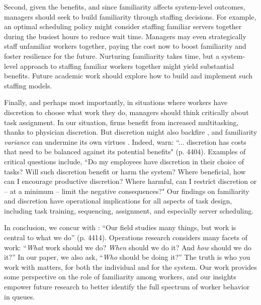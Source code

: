  Second, given the benefits, and since familiarity affects system-level outcomes, managers should seek to build familiarity through staffing decisions. For example, an optimal scheduling policy might consider staffing familiar servers together during the busiest hours to reduce wait time. Managers may even strategically staff unfamiliar workers together, paying the cost now to boost familiarity and foster resilience for the future. Nurturing familiarity takes time, but a system-level approach to staffing familiar workers together might yield substantial benefits. Future academic work should explore how to build and implement such staffing models.
 
 Finally, and perhaps most importantly, in situations where workers have discretion to choose what work they do, managers should think critically about task assignment. In our situation, firms benefit from increased multitasking, thanks to physician discretion. But discretion might also backfire \citep[e.g.,][]{Ibanez2017}, and familiarity \textit{variance} can undermine its own virtues \citep{Avgerinos2017}. Indeed, \cite{Ibanez2017} warn: “... discretion has costs that need to be balanced against its potential benefits" (p. 4404). Examples of critical questions include, “Do my employees have discretion in their choice of tasks? Will such discretion benefit or harm the system? Where beneficial, how can I encourage productive discretion? Where harmful, can I restrict discretion or -- at a minimum -- limit the negative consequences?" Our findings on familiarity and discretion have operational implications for all aspects of task design, including task training, sequencing, assignment, and especially server scheduling.
 
 In conclusion, we concur with \cite{KC2020_tcp}: “Our field studies many things, but work is central to what we do” (p. 4414). Operations research considers many facets of work: “\textit{What} work should we do? \textit{When} should we do it? And \textit{how} should we do it?” In our paper, we also ask, “\textit{Who} should be doing it?” The truth is who you work with matters, for both the individual and for the system. Our work provides some perspective on the role of familiarity among workers, and our insights empower future research to better identify the full spectrum of worker behavior in queues.